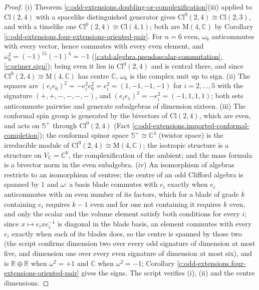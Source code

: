 \documentclass[11pt]{article}
\theoremstyle{definition}
\theoremstyle{plain}
\providecommand{\C}{}\renewcommand{\C}{\mathbb{C}}
\providecommand{\CS}{}\renewcommand{\CS}{{\mathbb{S}^{+}}}
\providecommand{\Cl}{}\renewcommand{\Cl}{\mathrm{Cl}}
\providecommand{\Mat}{}\renewcommand{\Mat}{\mathrm{M}}
\providecommand{\R}{}\renewcommand{\R}{\mathbb{R}}
\begin{document}
\begin{proof}
(i) Theorem \ref{c:odd-extensions.doubling-or-complexification}(iii) applied to $\Cl(2,4)$ with a spacelike distinguished generator gives $\Cl^{0}(2,4) \cong \Cl(2,3)$, and with a timelike one $\Cl^{0}(2,4) \cong \Cl(4,1)$; both are $\Mat(4,\C)$ by Corollary \ref{c:odd-extensions.four-extensions-oriented-pair}. For $n = 6$ even, $\omega_{6}$ anticommutes with every vector, hence commutes with every even element, and $\omega_{6}^{2} = (-1)^{15}(-1)^{4} = -1$ (\ref{c:std-algebra.pseudoscalar-commutation}, \ref{c:primer.sign}); being even it lies in $\Cl^{0}(2,4)$ and is central there, and since $\Cl^{0}(2,4) \cong \Mat(4,\C)$ has centre $\C$, $\omega_{6}$ is the complex unit up to sign. (ii) The squares are $(e_{i}e_{6})^{2} = -e_{i}^{2}e_{6}^{2} = e_{i}^{2} = (1, -1, -1, -1)$ for $i = 2, \ldots, 5$ with the signature $(+,+,-,-,-,-)$, and $(e_{i}e_{1})^{2} = -e_{i}^{2} = (-1, 1, 1, 1)$; both sets anticommute pairwise and generate subalgebras of dimension sixteen. (iii) The conformal spin group is generated by the bivectors of $\Cl(2,4)$, which are even, and acts on $\CS$ through $\Cl^{0}(2,4)$ (Fact \ref{c:odd-extensions.imported-conformal-completion}); the conformal spinor space $\CS \cong \C^{4}$ (twistor space) is the irreducible module of $\Cl^{0}(2,4) \cong \Mat(4,\C)$; the isotropic structure is a structure on $V_{\C} = \C^{6}$, the complexification of the ambient; and the mass formula is a bivector norm in the even subalgebra. (iv) An isomorphism of algebras restricts to an isomorphism of centres; the centre of an odd Clifford algebra is spanned by $1$ and $\omega$: a basis blade commutes with $e_{i}$ exactly when $e_{i}$ anticommutes with an even number of its factors, which for a blade of grade $k$ containing $e_{i}$ requires $k - 1$ even and for one not containing it requires $k$ even, and only the scalar and the volume element satisfy both conditions for every $i$; since $x \mapsto e_{i}xe_{i}^{-1}$ is diagonal in the blade basis, an element commutes with every $e_{i}$ exactly when each of its blades does, so the centre is spanned by those two (the script confirms dimension two over every odd signature of dimension at most five, and dimension one over every even signature of dimension at most six), and is $\R \oplus \R$ when $\omega^{2} = +1$ and $\C$ when $\omega^{2} = -1$; Corollary \ref{c:odd-extensions.four-extensions-oriented-pair} gives the signs. The script verifies (i), (ii) and the centre dimensions.

\end{proof}
\end{document}
